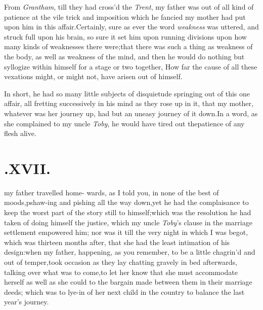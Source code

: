\documentclass{article}
\begin{document}
From \textit{Grantham}, till they had cross’d the
\textit{Trent}, my father was out of all kind of patience at the vile
trick and imposition which he fancied my mother had put upon him in
this affair.\tsk  \lqq Certainly,\break 
{} 
sure as ever the word \textit{weakness} was uttered, and
struck full upon his brain,\tsh\break
so sure it set him upon running divisions upon how
many kinds of weaknesses there were;\tsh  that there was\break 
such a thing as weakness of the body,\break
\tsh  as well as weakness of the mind,\tsk\break
and then he would do nothing but syl\-logize within himself for a stage or
two
together, How far the cause of all these\break
vexations might, or might not, have\break
arisen out of himself.

In short, he had so many little subjects of disquietude
springing out of this one affair, all fretting successively in his
mind as they rose up in it, that my mother, whatever was her
journey up, had but an uneasy journey of it down.\tsh\break  In a
word, as she complained to my uncle \textit{Toby}, he would have
tired out the\break patience of any flesh alive.

\section{.\enspace XVII.}

 my father travelled home-\break
wards, as I told you, in none of\break
the best of moods,\tsk  pshaw-ing and
pish\-ing all the way down,\tsk  yet he had the complaisance to keep
the worst part of the story still to himself;\tsk  which was the
resolution he had taken of doing himself the justice, which my
uncle \textit{Toby}’s clause in the marriage settlement
empowered him; nor was it till the very night in which I was begot,
which was thirteen months after, that she had the least intimation
of his design:\tsh when my father, happening, as you remember, to be a
little chagrin’d and out of temper,\tsh  took
occasion as they lay chatting gravely in bed afterwards, talking
over what was to come,\tsh  to let her know that she must
accommodate herself as well as she could to the bargain made
between them in their marriage deeds; which was to lye-in of her
next child in the country to balance the last year’s
journey.
\end{document}
